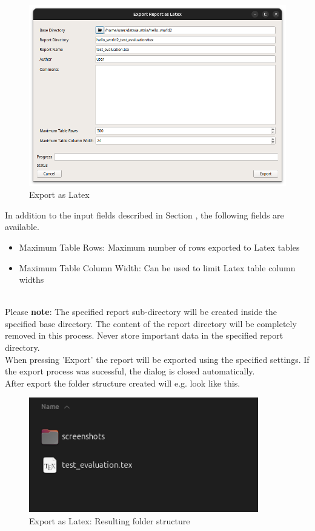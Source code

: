 \begin{figure}[H]
    \hspace*{-2.5cm}
    \center
    \includegraphics[width=14cm]{figures/export_latex.png}
  \caption{Export as Latex}
\end{figure}

In addition to the input fields described in Section , 
the following fields are available.

\begin{itemize}  
    \item Maximum Table Rows: Maximum number of rows exported to Latex tables
    \item Maximum Table Column Width: Can be used to limit Latex table column widths
\end{itemize}
\ \\

Please \textbf{note}: The specified report sub-directory will be created inside the specified base directory.
The content of the report directory will be completely removed in this process.
Never store important data in the specified report directory. \\

When pressing 'Export' the report will be exported using the specified settings.
If the export process was sucessful, the dialog is closed automatically. \\

After export the folder structure created will e.g. look like this.

\begin{figure}[H]
    \hspace*{-2.5cm}
    \center
    \includegraphics[width=10cm,frame]{figures/export_latex_result.png}
  \caption{Export as Latex: Resulting folder structure}
\end{figure}

